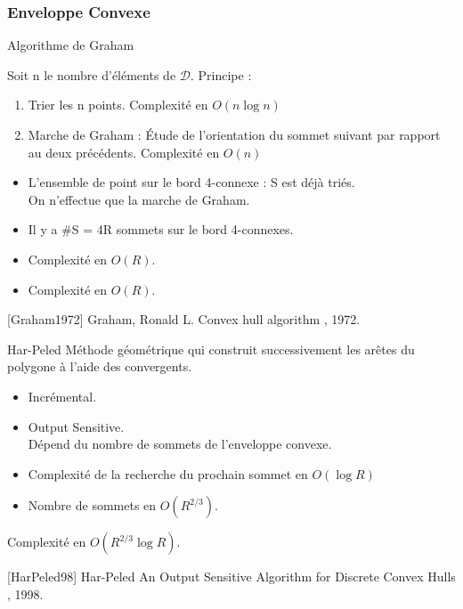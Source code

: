 \begin{frame}
\frametitle{Enveloppe Convexe}
\begin{block}{Algorithme de Graham}
  {
  Soit n le nombre d'éléments de $\mathcal{D}$.
  Principe :
  \begin{enumerate}
    \item Trier les n points. Complexité en $O(n \log n)$
    \item Marche de Graham : Étude de l'orientation du sommet suivant par rapport au deux précédents. Complexité en $O(n)$
  \end{enumerate}

  \begin{itemize}
    \item L'ensemble de point sur le bord 4-connexe : S est déjà triés.\\
    On n'effectue que la marche de Graham.
    \item Il y a \#S = 4R sommets sur le bord 4-connexes.
    \item Complexité en $O(R)$.
  \end{itemize}
  
 }
  {
  \begin{itemize}
    \item Complexité en $O(R)$.
  \end{itemize}
 }  
\end{block}

{
  \scriptsize
  \begin{thebibliography}{alpha}
    [Graham1972] Graham, Ronald L.
    \newblock Convex hull algorithm
    , 1972. 
  \end{thebibliography}
}
{
  \begin{block}{Har-Peled}  
    Méthode géométrique qui construit successivement les arêtes du polygone à l’aide des convergents.
    \begin{itemize}
      \item Incrémental.
      \item Output Sensitive.\\
      Dépend du nombre de sommets de l’enveloppe convexe.
    \end{itemize}  

    \begin{itemize}
      \item Complexité de la recherche du prochain sommet en $O(\log R)$
      \item Nombre de sommets en $O(R^{2/3})$. 
    \end{itemize}
    Complexité en $O(R^{2/3} \log R)$.
  \end{block}

  \scriptsize
  \begin{thebibliography}{alpha}
    [HarPeled98] Har-Peled
    \newblock An Output Sensitive Algorithm for Discrete Convex Hulls
    , 1998.
    \end{thebibliography}
}
\end{frame}
